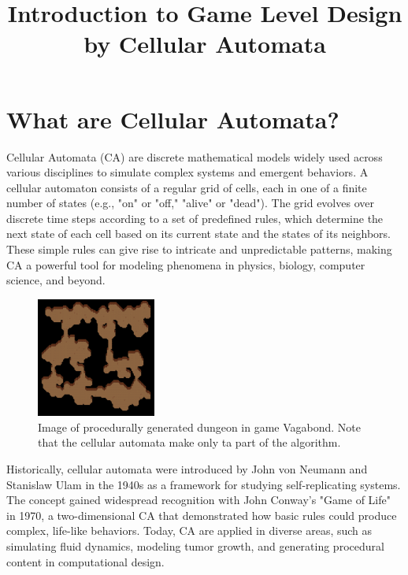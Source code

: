 \documentclass{article}
\title{Introduction to Game Level Design by Cellular Automata}
\begin{document}
\maketitle

\section{What are Cellular Automata?}

Cellular Automata (CA) are discrete mathematical models widely used across various disciplines to simulate complex systems and emergent behaviors. A cellular automaton consists of a regular grid of cells, each in one of a finite number of states (e.g., "on" or "off," "alive" or "dead"). The grid evolves over discrete time steps according to a set of predefined rules, which determine the next state of each cell based on its current state and the states of its neighbors. These simple rules can give rise to intricate and unpredictable patterns, making CA a powerful tool for modeling phenomena in physics, biology, computer science, and beyond.

\begin{figure}[h!]
    \centering
    \includegraphics[width=0.35\textwidth]{projects/game_level_design/images/ca_cave.png}
    \caption{Image of procedurally generated dungeon in game Vagabond. Note that the cellular automata make only ta part of the algorithm.}
\end{figure}


Historically, cellular automata were introduced by John von Neumann and Stanislaw Ulam in the 1940s as a framework for studying self-replicating systems. The concept gained widespread recognition with John Conway's "Game of Life" in 1970, a two-dimensional CA that demonstrated how basic rules could produce complex, life-like behaviors. Today, CA are applied in diverse areas, such as simulating fluid dynamics, modeling tumor growth, and generating procedural content in computational design.
\end{document}
